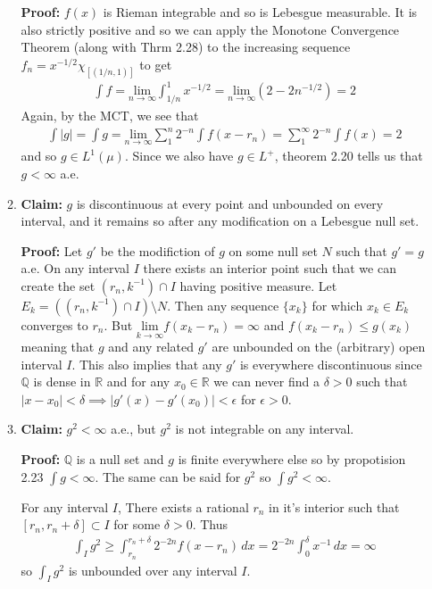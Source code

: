 \documentclass[11pt,letter]{article}
\begin{document}
\begin{enumerate}
\begin{enumerate}
        \textbf{Proof:} $f(x)$ is Rieman integrable and so is Lebesgue measurable. It is also strictly positive and so we can apply the Monotone Convergence Theorem (along with Thrm 2.28) to the increasing sequence $f_n = x^{-1/2}\chi_{[(1/n,1)]}$ to get
        \begin{align*}
            \int f = \underset{n \rightarrow \infty}{\text{lim}} \int_{1/n}^1 x^{-1/2} = \underset{n \rightarrow \infty}{\text{lim}} (2 - 2n^{-1/2}) = 2
        \end{align*}
        Again, by the MCT, we see that
        \begin{align*}
            \int |g| = \int g = \underset{n \rightarrow \infty}{\text{lim}} \sum_1^n 2^{-n} \int f(x-r_n) = \sum_1^\infty 2^{-n} \int f(x) = 2
        \end{align*}
        and so $g \in L^1(\mu)$. Since we also have $g \in L^+$, theorem 2.20 tells us that $g < \infty$ a.e.

        \item \textbf{Claim:} $g$ is discontinuous at every point and unbounded on every interval, and it remains so after any modification on a Lebesgue null set.
        
        \textbf{Proof:} Let $g'$ be the modifiction of $g$ on some null set $N$ such that $g' = g$ a.e. On any interval $I$ there exists an interior point such that we can create the  set $(r_n, k^{-1}) \cap I$ having positive measure. Let $E_k = ((r_n, k^{-1}) \cap I) \setminus N$. Then any sequence $\{x_k\}$ for which $x_k \in E_k$ converges to $r_n$. But $\underset{k \rightarrow \infty}{\text{lim}} f(x_k - r_n) = \infty$ and $f(x_k - r_n) \le g(x_k)$ meaning that $g$ and any related $g'$ are unbounded on the (arbitrary) open interval $I$. This also implies that any $g'$ is everywhere discontinuous since $\mathbb{Q}$ is dense in $\mathbb{R}$ and for any $x_0 \in \mathbb{R}$ we can never find a $\delta > 0$ such that $|x - x_0| < \delta \implies |g'(x) - g'(x_0)| < \epsilon$ for $\epsilon > 0$.

        \item \textbf{Claim:} $g^2 < \infty$ a.e., but $g^2$ is not integrable on any interval.
        
        \textbf{Proof:} $\mathbb{Q}$ is a null set and $g$ is finite everywhere else so by propotision 2.23 $\int g < \infty$. The same can be said for $g^2$ so $\int g^2 < \infty$.

        For any interval $I$, There exists a rational $r_n$ in it's interior such that $[r_n, r_n + \delta] \subset I$ for some $\delta > 0$. Thus
        \begin{align*}
            \int_I g^2 \ge \int_{r_n}^{r_n + \delta} 2^{-2n}f(x - r_n)\,dx = 2^{-2n} \int_0^\delta x^{-1}\,dx = \infty
        \end{align*}
        so $\int_I g^2$ is unbounded over any interval $I$.
    \end{enumerate}


\end{enumerate}
\end{document}
